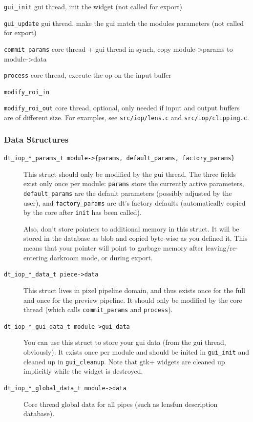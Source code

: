 \documentclass[a4paper,twoside]{scrartcl}
\newcommand{\code}[1]{\texttt{\color{codecol}#1}}
\begin{document}
\begin{description}
  \item \code{gui\_init} gui thread, init the widget (not called for export)
  \item \code{gui\_update} gui thread, make the gui match the modules parameters (not called for export)
  \item \code{commit\_params} core thread + gui thread in synch, copy module->params to module->data
  \item \code{process} core thread, execute the op on the input buffer
  \item \code{modify\_roi\_in}
  \item \code{modify\_roi\_out} core thread, optional, only needed if input and output buffers are of different size.
    For examples, see \code{src/iop/lens.c} and \code{src/iop/clipping.c}.
\end{description}

\subsubsection{Data Structures}

\begin{description}
  \item[\code{dt\_iop\_*\_params\_t module->\{params, default\_params, factory\_params\}}]

  This struct should only be modified by the gui thread. The three fields exist only once per module: \code{params}
  store the currently active parameters, \code{default\_params} are the default parameters (possibly adjusted by the
  user), and \code{factory\_params} are dt's factory defaults (automatically copied by the core after \code{init} has been
  called).

  Also, don't store pointers to additional memory in this struct. It will be
  stored in the database as blob and copied byte-wise as you defined it. This
  means that your pointer will point to garbage memory after leaving/re-entering
  darkroom mode, or during export.

  \item[\code{dt\_iop\_*\_data\_t piece->data}]
  This struct lives in pixel pipeline domain, and thus exists once for the full and once for the preview pipeline.
  It should only be modified by the core thread (which calls \code{commit\_params} and \code{process}).

  \item[\code{dt\_iop\_*\_gui\_data\_t module->gui\_data}]
  You can use this struct to store your gui data (from the gui thread, obviously). It exists once per module and should be inited in \code{gui\_init} and
  cleaned up in \code{gui\_cleanup}. Note that gtk+ widgets are cleaned up implicitly while the widget is destroyed.

  \item[\code{dt\_iop\_*\_global\_data\_t module->data}]
  Core thread global data for all pipes (such as lensfun description database).
\end{description}
\end{document}
